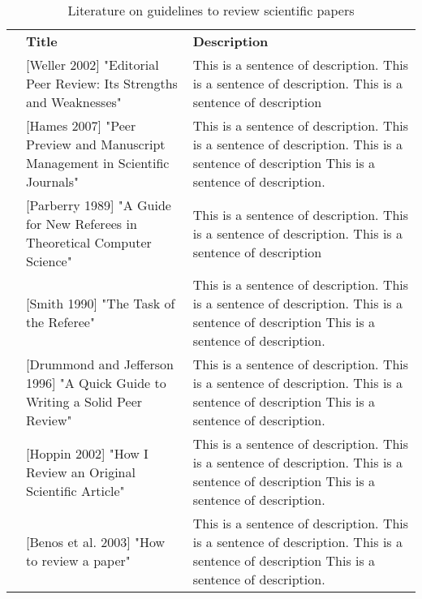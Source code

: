 \documentclass[preview]{standalone}
\begin{document}
\begin{table} \footnotesize  
\caption{Literature on guidelines to review scientific papers}
\newcommand{\titleWidth}{.30\textwidth}
\newcommand{\oneRow}[3]{
    &#1 \newline #2 & #3 
}
\newcommand{\mynewline}{\\} %
\begin{tabularx}{\textwidth}{c|p{\titleWidth}|X|} 
    \cline{2-3}
     & \textbf{Title} & \textbf{Description}\\ \hhline {-==}
    \multicolumn{1}{|c||}{ \multirow{2}{*}[-15pt]{\rotatebox[origin=c]{90}{\textbf{Books}}}}
    \oneRow{[Weller 2002]}{"Editorial Peer Review: Its Strengths and Weaknesses"}{This is a sentence of description. This is a sentence of description. This is a sentence of description}  \\ \cline{2-3} 
    \multicolumn{1}{|c||}{
    } \oneRow{[Hames 2007]}{"Peer Preview and Manuscript Management in Scientific Journals"}{This is a sentence of description. This is a sentence of description. This is a sentence of description This is a sentence of description.}  \mynewline \hhline{===}
    \multicolumn{1}{|c||}{ \multirow{6}{*}[-60pt]{\rotatebox[origin=c]{90}{\textbf{Journal Articles}}}}
    \oneRow{[Parberry 1989]}{"A Guide for New Referees in Theoretical Computer Science"}{This is a sentence of description. This is a sentence of description. This is a sentence of description}  \\ \cline{2-3} 
    \multicolumn{1}{|c||}{} \oneRow{[Smith 1990]}{"The Task of the Referee"}{This is a sentence of description. This is a sentence of description. This is a sentence of description This is a sentence of description.}  \\ \cline{2-3}
    \multicolumn{1}{|c||}{} \oneRow{[Drummond and Jefferson 1996]}{"A Quick Guide to Writing a Solid Peer Review"}{This is a sentence of description. This is a sentence of description. This is a sentence of description This is a sentence of description.}  \\ \cline{2-3}
    \multicolumn{1}{|c||}{} \oneRow{[Hoppin 2002]}{"How I Review an Original Scientific Article"}{This is a sentence of description. This is a sentence of description. This is a sentence of description This is a sentence of description.}  \\ \cline{2-3}
    \multicolumn{1}{|c||}{} \oneRow{[Benos et al. 2003]}{"How to review a paper"}{This is a sentence of description. This is a sentence of description. This is a sentence of description This is a sentence of description.}  \\ \cline{2-3}

\end{tabularx}
\end{table}
\end{document}
